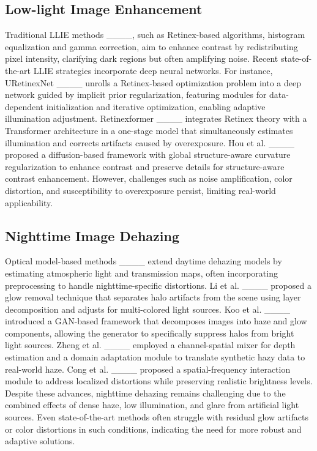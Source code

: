 \subsection{Low-light Image Enhancement}
%
    Traditional LLIE methods ____, such as Retinex-based algorithms, histogram equalization and gamma correction, aim to enhance contrast by redistributing pixel intensity, clarifying dark regions but often amplifying noise. Recent state-of-the-art LLIE strategies incorporate deep neural networks. For instance, URetinexNet ____ unrolls a Retinex-based optimization problem into a deep network guided by implicit prior regularization, featuring modules for data-dependent initialization and iterative optimization, enabling adaptive illumination adjustment. Retinexformer ____ integrates Retinex theory with a Transformer architecture in a one-stage model that simultaneously estimates illumination and corrects artifacts caused by overexposure. Hou et al. ____ proposed a diffusion-based framework with global structure-aware curvature regularization to enhance contrast and preserve details for structure-aware contrast enhancement. However, challenges such as noise amplification, color distortion, and susceptibility to overexposure persist, limiting real-world applicability.
%    
\subsection{Nighttime Image Dehazing}
%
    Optical model-based methods ____ extend daytime dehazing models by estimating atmospheric light and transmission maps, often incorporating preprocessing to handle nighttime-specific distortions.  Li et al. ____ proposed a glow removal technique  that separates halo artifacts from the scene using layer decomposition and adjusts for multi-colored light sources. Koo et al. ____ introduced a GAN-based framework that decomposes images into haze and glow components, allowing the generator to specifically suppress halos from bright light sources. Zheng et al. ____ employed a channel-spatial mixer for depth estimation and a domain adaptation module to translate synthetic hazy data to real-world haze. Cong et al. ____ proposed a spatial-frequency interaction module to address localized distortions while preserving realistic brightness levels. Despite these advances, nighttime dehazing remains challenging due to the combined effects of dense haze, low illumination, and glare from artificial light sources. Even state-of-the-art methods often struggle with residual glow artifacts or color distortions in such conditions, indicating the need for more robust and adaptive solutions.
    
